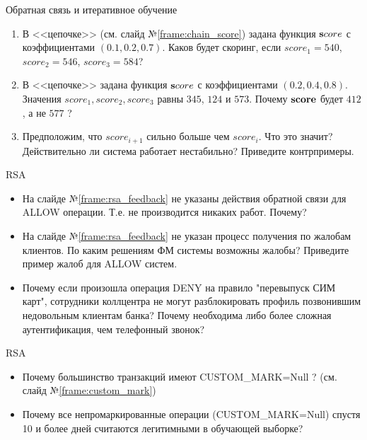 \begin{frame}{Обратная связь и итеративное обучение}
	\begin{enumerate}
		\item В <<цепочке>> (см. слайд №\ref{frame:chain_score}) задана функция
		$\bold score$ с коэффициентами $(0.1, 0.2, 0.7)$. Каков будет скоринг, 
		если $score_1=540$, $score_2=546$, $score_3=584$?
		\item В <<цепочке>> задана функция 	$\bold score$ 
		с коэффициентами $(0.2, 0.4, 0.8)$. Значения $score_1, score_2, score_3$
		равны $345$, $124$ и $573$. Почему $\bold {score}$ 
		будет $412$, 
		а не $577$ ?
		\item Предположим, что $score_{i+1}$ 
		сильно больше чем $score_i$. Что это значит? 
		Действительно ли система работает нестабильно? 
		Приведите контрпримеры.
		
	\end{enumerate}
\end{frame}

\begin{frame}{RSA}
	\begin{itemize}
		\item На слайде №\ref{frame:rsa_feedback} не указаны действия
		обратной связи для ALLOW операции. Т.е. не производится никаких работ. 
		Почему?
		\item На слайде №\ref{frame:rsa_feedback} не указан процесс получения 
		по жалобам клиентов. По каким решениям ФМ системы возможны жалобы? 
		Приведите пример жалоб для ALLOW систем. 
		\item Почему если произошла операция DENY на правило "перевыпуск СИМ карт", 
		сотрудники коллцентра не могут разблокировать профиль позвонившим
		недовольным клиентам банка? Почему необходима либо более сложная аутентификация, чем 
		телефонный звонок?
	\end{itemize}
\end{frame}

\begin{frame}{RSA}
\begin{itemize}
	\item Почему большинство транзакций имеют CUSTOM\_MARK=Null ?
	(см. слайд №\ref{frame:custom_mark})
	\item Почему все непромаркированные операции (CUSTOM\_MARK=Null) спустя 10 и более дней считаются 
	легитимными в обучающей выборке?
\end{itemize}
\end{frame}

